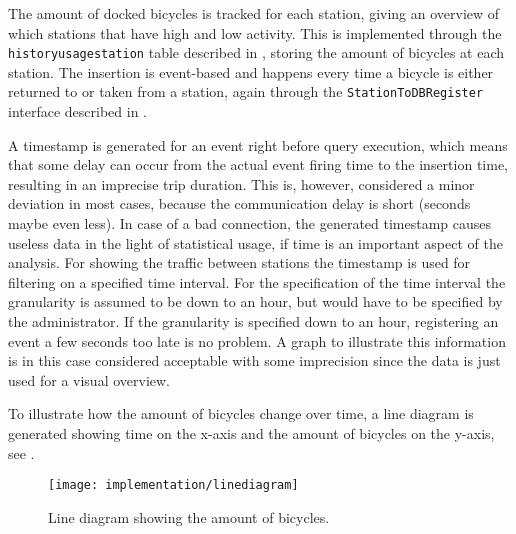 The amount of docked bicycles is tracked for each station, giving an overview of which stations that have high and low activity.
This is implemented through the \texttt{historyusagestation} table described in , storing the amount of bicycles at each station.
The insertion is event-based and happens every time a bicycle is either returned to or taken from a station, again through the \texttt{StationToDBRegister} interface described in .

A timestamp is generated for an event right before query execution, which means that some delay can occur from the actual event firing time to the insertion time, resulting in an imprecise trip duration. 
This is, however, considered a minor deviation in most cases, because the communication delay is short (seconds maybe even less).
In case of a bad connection, the generated timestamp causes useless data in the light of statistical usage, if time is an important aspect of the analysis.
For showing the traffic between stations the timestamp is used for filtering on a specified time interval.
For the specification of the time interval the granularity is assumed to be down to an hour, but would have to be specified by the administrator.
If the granularity is specified down to an hour, registering an event a few seconds too late is no problem.
A graph to illustrate this information is in this case considered acceptable with some imprecision since the data is just used for a visual overview.

To illustrate how the amount of bicycles change over time, a line diagram is generated showing time on the x-axis and the amount of bicycles on the y-axis, see .
\begin{figure}[h]
\centering
\texttt{[image: implementation/linediagram]}
\caption{Line diagram showing the amount of bicycles.}\label{fig:linediagram}
\end{figure}

